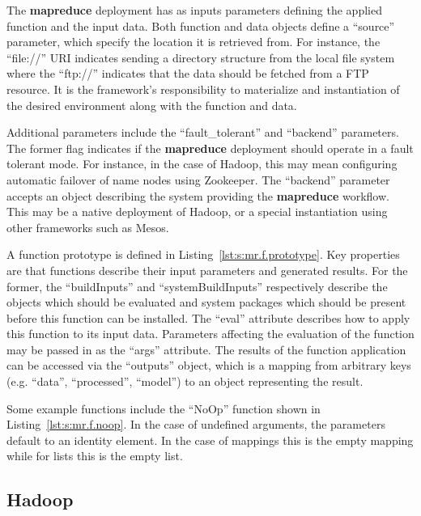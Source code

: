 \documentclass[9pt,twocolumn]{styles/osajnl}
\begin{document}
The \textbf{mapreduce} deployment has as inputs parameters defining
the applied function and the input data.  Both function and data
objects define a ``source'' parameter, which specify the location it
is retrieved from. For instance, the ``file://'' URI indicates sending
a directory structure from the local file system where the ``ftp://''
indicates that the data should be fetched from a FTP resource. It is
the framework's responsibility to materialize and instantiation of the
desired environment along with the function and data.


Additional parameters include the ``fault\_tolerant'' and ``backend''
parameters.  The former flag indicates if the \textbf{mapreduce}
deployment should operate in a fault tolerant mode. For instance, in
the case of Hadoop, this may mean configuring automatic failover of
name nodes using Zookeeper.  The ``backend'' parameter accepts an
object describing the system providing the \textbf{mapreduce}
workflow.  This may be a native deployment of Hadoop, or a special
instantiation using other frameworks such as Mesos.

A function prototype is defined in Listing~\ref{lst:s:mr.f.prototype}.
Key properties are that functions describe their input parameters and
generated results. For the former, the ``buildInputs'' and
``systemBuildInputs'' respectively describe the objects which should
be evaluated and system packages which should be present before this
function can be installed. The ``eval'' attribute describes how to
apply this function to its input data. Parameters affecting the
evaluation of the function may be passed in as the ``args'' attribute.
The results of the function application can be accessed via the
``outputs'' object, which is a mapping from arbitrary keys
(e.g. ``data'', ``processed'', ``model'') to an object representing
the result.



Some example functions include the ``NoOp'' function shown in
Listing~\ref{lst:s:mr.f.noop}.  In the case of undefined arguments,
the parameters default to an identity element. In the case of mappings
this is the empty mapping while for lists this is the empty list.



\subsection{Hadoop}
\end{document}
